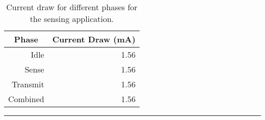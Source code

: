 \renewcommand{\arraystretch}{1.2}
\begin{table*}[t]
    \begin{threeparttable}
        {\footnotesize
            \begin{tabularx}{\textwidth}{rr}

                \multicolumn{1}{c}{\textbf{Phase}} &
                    \multicolumn{1}{c}{\textbf{Current Draw (mA)}} \\ \toprule

                    Idle &
                     1.56 \\ 
                      Sense &
                      1.56 \\
                       Transmit &
                       1.56 \\
                        Combined &
                        1.56 \\


                    \end{tabularx}
                }

                \vspace*{-0.1in}

                \caption{Current draw for different phases for the sensing application.}

                \vspace*{0.1in}
                \hrule
                \vspace*{-0.2in}

            \end{threeparttable}
            \label{table-currentdraw}
        \end{table*}
